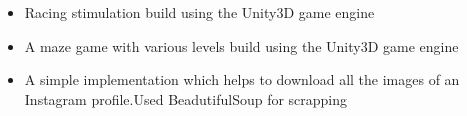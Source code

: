 \begin{itemize}
\item\justify Racing stimulation build using the Unity3D game engine
\end{itemize}
\smallskip

\begin{itemize}
\item\justify A maze game with various levels build using the Unity3D game engine
\end{itemize}
\smallskip

\begin{itemize}
\item\justify A simple implementation which helps to download all the images of an Instagram
profile.Used BeadutifulSoup for scrapping
\end{itemize}
\smallskip



\clearpage






